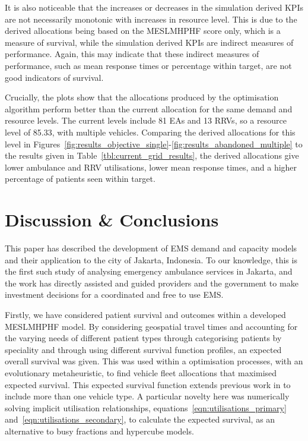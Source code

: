 \documentclass[numbers,webpdf,imaman]{ima-authoring-template}%
\begin{document}
It is also noticeable that the increases or decreases in the simulation
derived KPIs are not necessarily monotonic with increases in resource level.
This is due to the derived allocations being based on the MESLMHPHF score
only, which is a measure of survival, while the simulation derived KPIs are
indirect measures of performance. Again, this may indicate that these indirect
measures of performance, such as mean response times or percentage within
target, are not good indicators of survival.

Crucially, the plots show that the allocations produced by the optimisation
algorithm perform better than the current allocation for the same demand and
resource levels. The current levels include 81 EAs and 13 RRVs, so a resource
level of 85.33, with multiple vehicles. Comparing the derived allocations for
this level in
Figures~\ref{fig:results_objective_single}-\ref{fig:results_abandoned_multiple}
to the results given in Table~\ref{tbl:current_grid_results}, the derived
allocations give lower ambulance and RRV utilisations, lower mean response
times, and a higher percentage of patients seen within target.


\section{Discussion \& Conclusions}\label{sec:discussion}
This paper has described the development of EMS demand and capacity models and
their application to the city of Jakarta, Indonesia. To our knowledge, this is
the first such study of analysing emergency ambulance services in Jakarta, and
the work has directly assisted and guided providers and the government to make
investment decisions for a coordinated and free to use EMS.

Firstly, we have considered patient survival and outcomes within a developed
MESLMHPHF model. By considering geospatial travel times and accounting for the
varying needs of different patient types through categorising patients by
speciality and through using different survival function profiles, an expected
overall survival was given. This was used within a optimisation processes, with
an evolutionary metaheuristic, to find vehicle fleet allocations that maximised
expected survival. This expected survival function extends previous work in
\citet{Knight2012918} to include more than one vehicle type. A particular novelty
here was numerically solving implicit utilisation relationships,
equations~\ref{eqn:utilisations_primary} and~\ref{eqn:utilisations_secondary},
to calculate the expected survival, as an alternative to busy fractions and
hypercube models.
\end{document}
